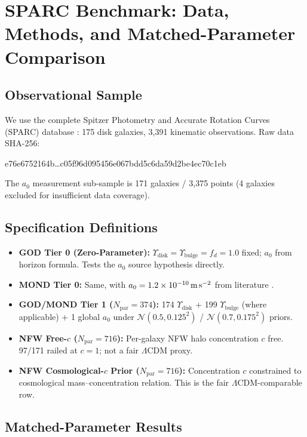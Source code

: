 \documentclass[aps,prd,preprint,superscriptaddress,nofootinbib,amsmath,amssymb,floatfix]{revtex4-2}
\begin{document}
\section{SPARC Benchmark: Data, Methods, and Matched-Parameter Comparison}
\label{sec:sparc}

\subsection{Observational Sample}

We use the complete Spitzer Photometry and Accurate Rotation Curves (SPARC) database \cite{Lelli2016}: 175 disk galaxies, 3,391 kinematic observations. Raw data SHA-256:
\begin{center}\ttfamily\small
e76e6752164b\ldots c05f96d095456e067bdd5c6da59d2be4ec70c1eb
\end{center}
The $a_0$ measurement sub-sample is 171 galaxies / 3,375 points (4 galaxies excluded for insufficient data coverage).

\subsection{Specification Definitions}

\begin{itemize}
    \item \textbf{GOD Tier 0 (Zero-Parameter):} $\Upsilon_{\text{disk}} = \Upsilon_{\text{bulge}} = f_d = 1.0$ fixed; $a_0$ from horizon formula. Tests the $a_0$ source hypothesis directly.
    \item \textbf{MOND Tier 0:} Same, with $a_0 = 1.2 \times 10^{-10}\,\text{m\,s}^{-2}$ from literature \cite{McGaugh2016}.
    \item \textbf{GOD/MOND Tier 1 ($N_{\text{par}} = 374$):} 174 $\Upsilon_{\text{disk}}$ + 199 $\Upsilon_{\text{bulge}}$ (where applicable) + 1 global $a_0$ under $\mathcal{N}(0.5, 0.125^2)$ / $\mathcal{N}(0.7, 0.175^2)$ priors.
    \item \textbf{NFW Free-$c$ ($N_{\text{par}} = 716$):} Per-galaxy NFW halo concentration $c$ free. 97/171 railed at $c=1$; not a fair $\Lambda$CDM proxy.
    \item \textbf{NFW Cosmological-$c$ Prior ($N_{\text{par}} = 716$):} Concentration $c$ constrained to cosmological mass--concentration relation. This is the fair $\Lambda$CDM-comparable row.
\end{itemize}

\subsection{Matched-Parameter Results}
\end{document}
